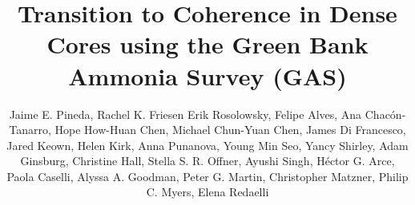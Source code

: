 \documentclass[preprint2]{aastex6}
\begin{document}

\title{Transition to Coherence in Dense Cores using 
the Green Bank Ammonia Survey (GAS)}



 \author{
Jaime E. Pineda, 
Rachel K. Friesen
Erik Rosolowsky, 
Felipe Alves, 
Ana Chac\'on-Tanarro,
Hope How-Huan Chen,
Michael Chun-Yuan Chen,
James Di Francesco,
Jared Keown,
Helen Kirk,
Anna Punanova,
Young Min Seo,
Yancy Shirley,
Adam Ginsburg,
Christine Hall,
Stella S. R. Offner,
Ayushi Singh,
H\'ector G. Arce,
Paola Caselli,
Alyssa A. Goodman,
Peter G. Martin,
Christopher Matzner,
Philip C. Myers,
Elena Redaelli
}
\end{document}
